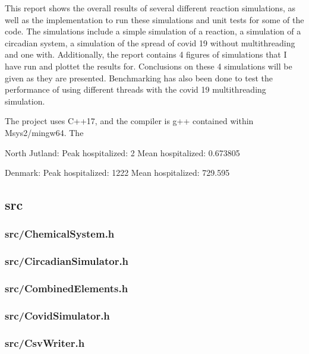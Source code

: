 This report shows the overall results of several different reaction simulations, as well as the implementation to run these simulations and unit tests for some of the code. 
The simulations include a simple simulation of a reaction, a simulation of a circadian system, a simulation of the spread of covid 19 without multithreading and one with.
Additionally, the report contains 4 figures of simulations that I have run and plottet the results for.
Conclusions on these 4 simulations will be given as they are presented.
Benchmarking has also been done to test the performance of using different threads with the covid 19 multithreading simulation.

The project uses C++17, and the compiler is g++ contained within Msys2/mingw64.
The 


North Jutland:
Peak hospitalized: 2
Mean hospitalized: 0.673805

Denmark:
Peak hospitalized: 1222
Mean hospitalized: 729.595


\newpage
\subsection{src}
\subsubsection{src/ChemicalSystem.h}

\newpage
\subsubsection{src/CircadianSimulator.h}

\newpage
\subsubsection{src/CombinedElements.h}

\newpage
\subsubsection{src/CovidSimulator.h}

\newpage
\subsubsection{src/CsvWriter.h}

\newpage
